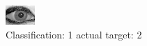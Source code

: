 \begin{figure}[h!]
\begin{center}
\includegraphics[width=0.60\columnwidth]{figures/ID2039_class_1_target_2.png}
\end{center}
\caption{ Classification: 1 actual target: 2}
\label{fig:ID2039_class_1_target_2}
\end{figure}
